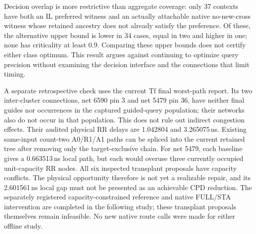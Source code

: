 Decision overlap is more restrictive than aggregate coverage: only 37 contexts have both an IL preferred witness and an actually attachable native no-new-cross witness whose retained ancestry does not already satisfy the preference. Of these, the alternative upper bound is lower in 34 cases, equal in two and higher in one; none has criticality at least 0.9. Comparing these upper bounds does not certify either class optimum. This result argues against continuing to optimize query precision without examining the decision interface and the connections that limit timing.

A separate retrospective check uses the current Tf final worst-path report. Its two inter-cluster connections, net 6590 pin 3 and net 5479 pin 36, have neither final guides nor occurrences in the captured guided-query population; their networks also do not occur in that population. This does not rule out indirect congestion effects. Their audited physical RR delays are 1.042804 and 3.265075\,ns. Existing same-input count-two A0/R1/A1 paths can be spliced into the current retained tree after removing only the target-exclusive chain. For net 5479, each baseline gives a 0.663513\,ns local path, but each would overuse three currently occupied unit-capacity RR nodes. All six inspected transplant proposals have capacity conflicts. The physical opportunity therefore is not yet a realizable repair, and its 2.601561\,ns local gap must not be presented as an achievable CPD reduction. The separately registered capacity-constrained reference and native FULL/STA intervention are completed in the following study; these transplant proposals themselves remain infeasible. No new native route calls were made for either offline study.

